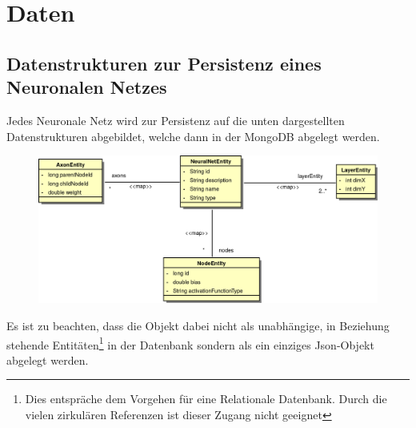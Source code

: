 \chapter{Daten}

\section{Datenstrukturen zur Persistenz eines Neuronalen Netzes}

Jedes Neuronale Netz wird zur Persistenz auf die unten dargestellten Datenstrukturen abgebildet, welche dann in der MongoDB abgelegt werden. 
\begin{figure}[h]
\begin{center}
\includegraphics[width=\textwidth]{Abbildungen/UML/jan/datenBankKlassendiagramm.png}
\end{center}
\end{figure}
Es ist zu beachten, dass die Objekt dabei nicht als unabhängige, in Beziehung stehende Entitäten\footnote{Dies entspräche dem Vorgehen für eine Relationale Datenbank. Durch die vielen zirkulären Referenzen ist dieser Zugang nicht geeignet} in der Datenbank sondern als ein einziges Json-Objekt abgelegt werden. 
